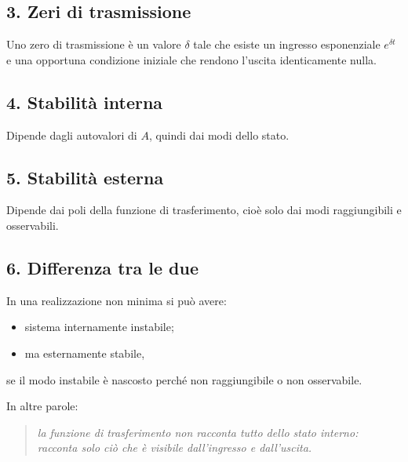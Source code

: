 \subsection*{3. Zeri di trasmissione}
Uno zero di trasmissione è un valore \(\delta\) tale che esiste un ingresso esponenziale \(e^{\delta t}\) e una opportuna condizione iniziale che rendono l'uscita identicamente nulla.

\subsection*{4. Stabilità interna}
Dipende dagli autovalori di \(A\), quindi dai modi dello stato.

\subsection*{5. Stabilità esterna}
Dipende dai poli della funzione di trasferimento, cioè solo dai modi raggiungibili e osservabili.

\subsection*{6. Differenza tra le due}
In una realizzazione non minima si può avere:
\begin{itemize}
    \item sistema internamente instabile;
    \item ma esternamente stabile,
\end{itemize}
se il modo instabile è nascosto perché non raggiungibile o non osservabile.

\medskip

In altre parole:
\begin{quote}
\emph{la funzione di trasferimento non racconta tutto dello stato interno: racconta solo ciò che è visibile dall'ingresso e dall'uscita.}
\end{quote}